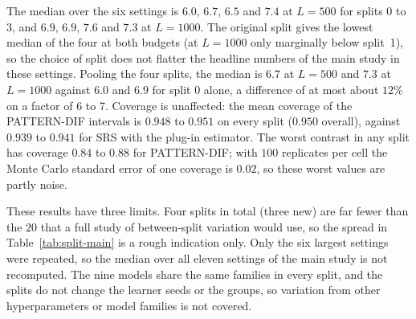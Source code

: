 The median over the six settings is $6.0$, $6.7$, $6.5$ and $7.4$ at $L=500$ for splits $0$ to $3$, and $6.9$, $6.9$, $7.6$ and $7.3$ at $L=1000$. The original split gives the lowest median of the four at both budgets (at $L=1000$ only marginally below split~1), so the choice of split does not flatter the headline numbers of the main study in these settings. Pooling the four splits, the median is $6.7$ at $L=500$ and $7.3$ at $L=1000$ against $6.0$ and $6.9$ for split $0$ alone, a difference of at most about $12\%$ on a factor of 6 to 7. Coverage is unaffected: the mean coverage of the PATTERN-DIF intervals is $0.948$ to $0.951$ on every split ($0.950$ overall), against $0.939$ to $0.941$ for SRS with the plug-in estimator. The worst contrast in any split has coverage $0.84$ to $0.88$ for PATTERN-DIF; with $100$ replicates per cell the Monte Carlo standard error of one coverage is $0.02$, so these worst values are partly noise.

These results have three limits. Four splits in total (three new) are far fewer than the $20$ that a full study of between-split variation would use, so the spread in Table~\ref{tab:split-main} is a rough indication only. Only the six largest settings were repeated, so the median over all eleven settings of the main study is not recomputed. The nine models share the same families in every split, and the splits do not change the learner seeds or the groups, so variation from other hyperparameters or model families is not covered.
